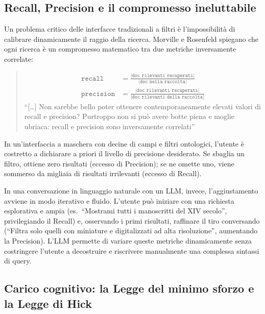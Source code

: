 \documentclass[12pt,a4paper,oneside]{book}
\newcommand{\var}{\texttt}
\begin{document}
    \subsection{Recall, Precision e il compromesso ineluttabile}\label{subsec:recall_precision}

    Un problema critico delle interfacce tradizionali a filtri è l'impossibilità di calibrare dinamicamente il raggio della ricerca. Morville e Rosenfeld spiegano che ogni ricerca è un compromesso matematico tra due metriche inversamente correlate:

    \begin{quotation}
        \begin{align}
            \var{recall} &= \frac{|\var{doc rilevanti recuperati}|}{|\var{doc nella raccolta}|} \label{eq:recall}\\[5pt]
            \var{precision} &= \frac{|\var{doc rilevanti recuperati}|}{|\var{doc rilevanti della raccolta}|} \label{eq:precision}
        \end{align}
        ``[\ldots] Non sarebbe bello poter ottenere contemporaneamente elevati valori di recall e precision? Purtroppo non si può avere botte piena e moglie ubriaca: recall e precision sono inversamente correlati''\hfill\cite{Mor08}
    \end{quotation}

    In un'interfaccia a maschera con decine di campi e filtri ontologici, l'utente è costretto a dichiarare a priori il livello di precisione desiderato. Se sbaglia un filtro, ottiene zero risultati (eccesso di Precision); se ne omette uno, viene sommerso da migliaia di risultati irrilevanti (eccesso di Recall).

    In una conversazione in linguaggio naturale con un LLM, invece, l'aggiustamento avviene in modo iterativo e fluido. L'utente può iniziare con una richiesta esplorativa e ampia (es.\ ``Mostrami tutti i manoscritti del XIV secolo'', privilegiando il Recall) e, osservando i primi risultati, raffinare il tiro conversando (``Filtra solo quelli con miniature e digitalizzati ad alta risoluzione'', aumentando la Precision). L'LLM permette di variare queste metriche dinamicamente senza costringere l'utente a decostruire e riscrivere manualmente una complessa sintassi di query.

    \subsection{Carico cognitivo: la Legge del minimo sforzo e la Legge di Hick}\label{subsec:cognitive_load}
\end{document}
